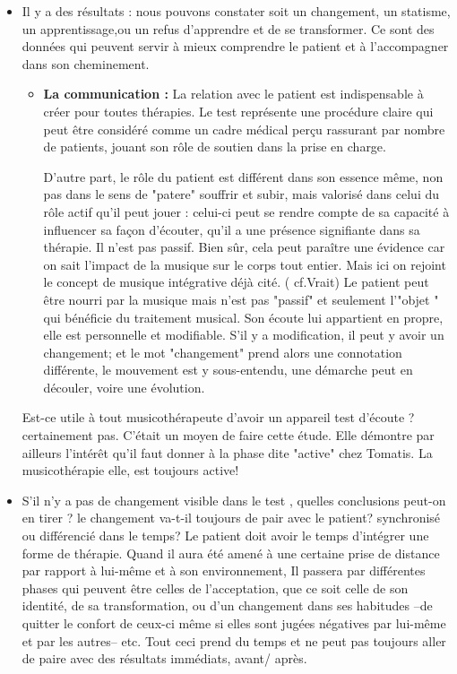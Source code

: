 \begin{itemize}
\item Il y a des résultats : nous pouvons constater soit un changement,
un statisme, un apprentissage,ou un refus d'apprendre et de se transformer.
Ce sont des données qui peuvent servir à mieux comprendre le patient
et à l'accompagner dans son cheminement.
\begin{itemize}
	\item \textbf{La communication : }
	La relation avec le patient est indispensable à créer pour toutes thérapies.
	Le test représente une procédure claire qui peut être considéré comme un cadre médical perçu rassurant par nombre de patients, jouant son rôle de soutien dans la prise en charge.
	
	D'autre part, le rôle du patient est différent dans son essence même, non pas dans le sens de "patere" souffrir et subir, mais valorisé dans celui du rôle actif qu'il peut jouer : celui-ci peut se rendre compte de sa capacité à influencer sa façon d'écouter, qu'il a une présence signifiante dans sa thérapie.  Il n'est pas passif. Bien sûr, cela peut paraître une évidence car on sait l'impact de la musique sur le corps tout entier. Mais ici on rejoint  le concept de musique intégrative déjà cité. ( cf.Vrait) Le patient peut être nourri par la musique mais n'est pas "passif" et seulement l'"objet " qui bénéficie du traitement musical. Son  écoute lui appartient en propre, elle est personnelle et modifiable. S'il y a modification, il peut y avoir un changement; et le mot "changement" prend alors une connotation différente,  le mouvement est y  sous-entendu,  une démarche peut en découler, voire une évolution. 
\end{itemize}


Est-ce utile à tout musicothérapeute d'avoir un appareil test d'écoute ? certainement pas. C'était un moyen de faire cette étude. Elle démontre par ailleurs  l'intérêt qu'il faut donner à la phase dite "active" chez Tomatis. La musicothérapie elle, est toujours active!

\item S'il n'y a pas de changement visible dans le test , quelles conclusions
peut-on en tirer ? le changement va-t-il toujours de pair avec le
patient? synchronisé ou différencié dans le temps?
Le patient doit avoir le temps d'intégrer une forme de thérapie. Quand il aura été amené à une certaine prise de distance par rapport à lui-même et à son environnement, Il passera par différentes phases qui peuvent être celles de l'acceptation, que ce soit celle de son identité, de sa transformation, ou d'un changement dans ses habitudes --de quitter le confort de ceux-ci même si elles sont jugées négatives par lui-même et par les autres-- etc. Tout ceci prend du temps et ne peut pas 
toujours  aller de paire avec des résultats immédiats, avant/ après.



\end{itemize}
